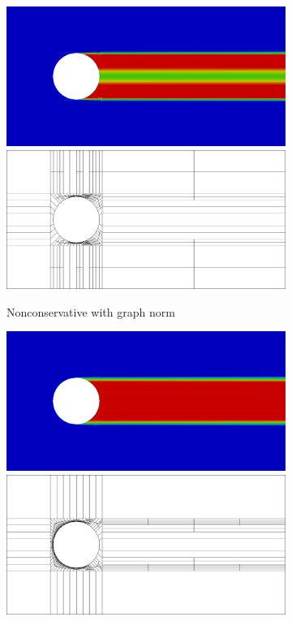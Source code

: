 \documentclass[letterpaper]{article}
\begin{document}
\begin{figure}
\centering
\begin{subfigure}[t]{0.45\textwidth}
\centering
\includegraphics[width=\textwidth]{figs/Hemker/graph4nc.png}
\includegraphics[width=\textwidth]{figs/Hemker/graph4nc_mesh.png}
\caption{Nonconservative with graph norm}
\label{fig:hemkerGraph4nc}
\end{subfigure}
\begin{subfigure}[t]{0.45\textwidth}
\centering
\includegraphics[width=\textwidth]{figs/Hemker/robust4nc.png}
\includegraphics[width=\textwidth]{figs/Hemker/robust4nc_mesh.png}

\end{subfigure}
\end{figure}
\end{document}
